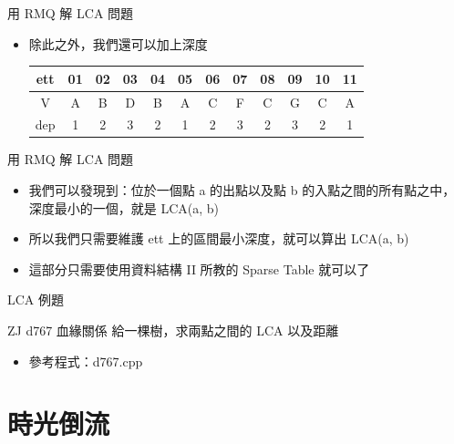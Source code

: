 \documentclass[aspectratio=169]{beamer}
\begin{document}
    \begin{frame}{用 RMQ 解 LCA 問題}
        \begin{itemize}
            \item 除此之外，我們還可以加上深度
            \begin{center}
                \begin{tabular}{c|c|c|c|c|c|c|c|c|c|c|c}
                    ett & 01 & 02 & 03 & 04 & 05 & 06 & 07 & 08 & 09 & 10 & 11\\
                    \hline
                    V & A & B & D & B & A & C & F & C & G & C & A\\
                    \hline
                    dep & 1 & 2 & 3 & 2 & 1 &2 & 3 & 2 & 3 & 2 & 1
                \end{tabular}
            \end{center}
        \end{itemize}
    \end{frame}

    \begin{frame}{用 RMQ 解 LCA 問題}
        \begin{itemize}
            \item<1-> 我們可以發現到：位於一個點 a 的出點以及點 b 的入點之間的所有點之中，深度最小的一個，就是 LCA(a, b)
            \item<2-> 所以我們只需要維護 ett 上的區間最小深度，就可以算出 LCA(a, b)
            \item<3-> 這部分只需要使用資料結構 II 所教的 Sparse Table 就可以了
        \end{itemize}
    \end{frame}

    \begin{frame}{LCA 例題}
        \begin{block}{ZJ d767 血緣關係}
            給一棵樹，求兩點之間的 LCA 以及距離
        \end{block}

        \begin{itemize}
            \item 參考程式：d767.cpp
        \end{itemize}
    \end{frame}

    \section{時光倒流}
\end{document}
